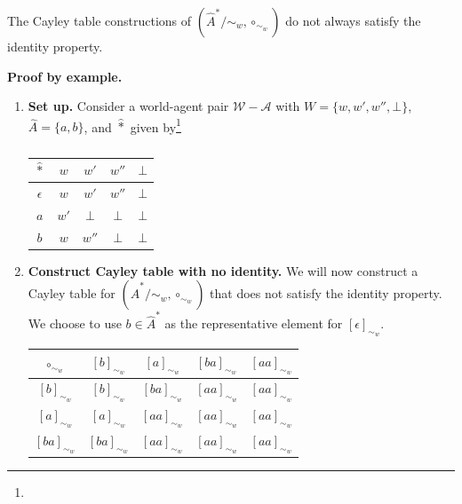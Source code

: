 \begin{propositionE}
    The Cayley table constructions of $(\hat{A}^{*}/\sim_{w}, \circ_{\sim_{w}})$ do not always satisfy the identity property.
\end{propositionE}
\begin{proofE}
\textbf{Proof by example.}
\begin{enumerate}
    \item \textbf{Set up.}
        Consider a world-agent pair $\mathscr{W}-\mathscr{A}$ with $W = \{ w, w', w'', \bot \}$, $\hat{A} = \{a, b\}$, and $\hat{\ast}$ given by\footnote{
        }
        \begin{table}[H]
            \centering
            \begin{tabular}{c|cccc}
                $\hat{\ast}$   & $w$       & $w'$      & $w''$     & $\bot$ \\
                \hline
                $\epsilon$      & $w$       & $w'$      & $w''$     & $\bot$ \\
                $a$             & $w'$      & $\bot$    & $\bot$    & $\bot$ \\
                $b$             & $w$       & $w''$     & $\bot$    & $\bot$
            \end{tabular}
            \caption{
            }
        \end{table}
    \item \textbf{Construct Cayley table with no identity.}
    We will now construct a Cayley table for $(\hat{A}^{*}/\sim_{w}, \circ_{\sim_{w}})$ that does not satisfy the identity property.
    We choose to use $b \in \hat{A}^{*}$ as the representative element for $[\epsilon]_{\sim_{w}}$.
    \begin{table}[H]
        \centering
        \begin{tabular}{c|cccc}
            $\circ_{\sim_{w}}$  & $[b]_{\sim_{w}}$  & $[a]_{\sim_{w}}$   & $[ba]_{\sim_{w}}$  & $[aa]_{\sim_{w}}$ \\
            \hline
            $[b]_{\sim_{w}}$    & $[b]_{\sim_{w}}$  & $[ba]_{\sim_{w}}$  & $[aa]_{\sim_{w}}$  & $[aa]_{\sim_{w}}$ \\
            $[a]_{\sim_{w}}$    & $[a]_{\sim_{w}}$  & $[aa]_{\sim_{w}}$  & $[aa]_{\sim_{w}}$  & $[aa]_{\sim_{w}}$ \\
            $[ba]_{\sim_{w}}$   & $[ba]_{\sim_{w}}$ & $[aa]_{\sim_{w}}$  & $[aa]_{\sim_{w}}$  & $[aa]_{\sim_{w}}$ \\

\end{tabular}
\end{table}
\end{enumerate}
\end{proofE}
